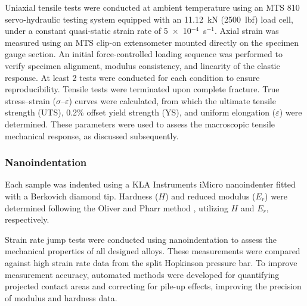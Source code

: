 Uniaxial tensile tests were conducted at ambient temperature using an MTS 810 servo-hydraulic testing system equipped with an 11.12~kN (2500~lbf) load cell, under a constant quasi-static strain rate of 5~$\times$~10$^{-4}$~s$^{-1}$. Axial strain was measured using an MTS clip-on extensometer mounted directly on the specimen gauge section. An initial force-controlled loading sequence was performed to verify specimen alignment, modulus consistency, and linearity of the elastic response. At least 2 tests were conducted for each condition to ensure reproducibility. Tensile tests were terminated upon complete fracture. True stress--strain ($\sigma$--$\varepsilon$) curves were calculated, from which the ultimate tensile strength (UTS), 0.2\% offset yield strength (YS), and uniform elongation ($\varepsilon$) were determined. These parameters were used to assess the macroscopic tensile mechanical response, as discussed subsequently.


    
\subsubsection{Nanoindentation} 

Each sample was indented using a KLA Instruments iMicro nanoindenter fitted with a Berkovich diamond tip. Hardness ($H$) and reduced modulus ($E_r$) were determined following the Oliver and Pharr method \cite{Oliver1992}, utilizing $H$ and $E_r$, respectively. %

Strain rate jump tests were conducted using nanoindentation to assess the mechanical properties of all designed alloys. These measurements were compared against high strain rate data from the split Hopkinson pressure bar. To improve measurement accuracy, automated methods were developed for quantifying projected contact areas and correcting for pile-up effects, improving the precision of modulus and hardness data.

